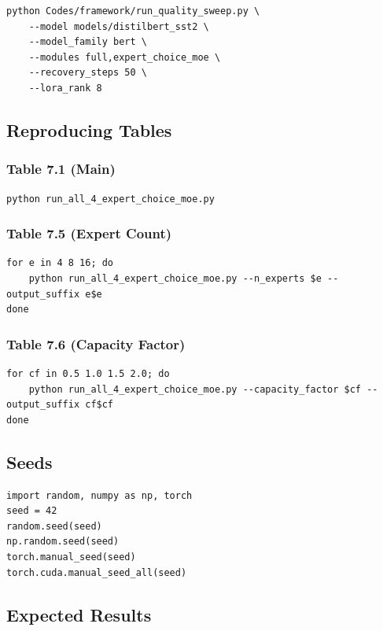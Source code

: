 \begin{lstlisting}
python Codes/framework/run_quality_sweep.py \
    --model models/distilbert_sst2 \
    --model_family bert \
    --modules full,expert_choice_moe \
    --recovery_steps 50 \
    --lora_rank 8
\end{lstlisting}

\subsection{Reproducing Tables}

\subsubsection{Table 7.1 (Main)}
\begin{lstlisting}
python run_all_4_expert_choice_moe.py
\end{lstlisting}

\subsubsection{Table 7.5 (Expert Count)}
\begin{lstlisting}
for e in 4 8 16; do
    python run_all_4_expert_choice_moe.py --n_experts $e --output_suffix e$e
done
\end{lstlisting}

\subsubsection{Table 7.6 (Capacity Factor)}
\begin{lstlisting}
for cf in 0.5 1.0 1.5 2.0; do
    python run_all_4_expert_choice_moe.py --capacity_factor $cf --output_suffix cf$cf
done
\end{lstlisting}

\subsection{Seeds}

\begin{lstlisting}
import random, numpy as np, torch
seed = 42
random.seed(seed)
np.random.seed(seed)
torch.manual_seed(seed)
torch.cuda.manual_seed_all(seed)
\end{lstlisting}

\subsection{Expected Results}

